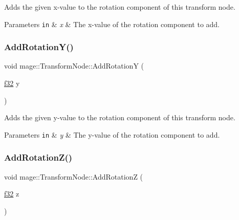 Adds the given x-\/value to the rotation component of this transform node.


\begin{DoxyParams}[1]{Parameters}
\mbox{\tt in}  & {\em x} & The x-\/value of the rotation component to add. \\
\hline
\end{DoxyParams}
\hypertarget{structmage_1_1_transform_node_aaec0123b3c40af36c346663045849447}{}\label{structmage_1_1_transform_node_aaec0123b3c40af36c346663045849447} 
\subsubsection{\texorpdfstring{Add\+Rotation\+Y()}{AddRotationY()}}
{\footnotesize\ttfamily void mage\+::\+Transform\+Node\+::\+Add\+RotationY (\begin{DoxyParamCaption}\item[{\hyperlink{namespacemage_a6a44ad388483959dc4dff9f2aef91431}{f32}}]{y }\end{DoxyParamCaption})\hspace{0.3cm}{\ttfamily [noexcept]}}

Adds the given y-\/value to the rotation component of this transform node.


\begin{DoxyParams}[1]{Parameters}
\mbox{\tt in}  & {\em y} & The y-\/value of the rotation component to add. \\
\hline
\end{DoxyParams}
\hypertarget{structmage_1_1_transform_node_ac1488ba0b460fa73ea387e9e08a9321b}{}\label{structmage_1_1_transform_node_ac1488ba0b460fa73ea387e9e08a9321b} 
\subsubsection{\texorpdfstring{Add\+Rotation\+Z()}{AddRotationZ()}}
{\footnotesize\ttfamily void mage\+::\+Transform\+Node\+::\+Add\+RotationZ (\begin{DoxyParamCaption}\item[{\hyperlink{namespacemage_a6a44ad388483959dc4dff9f2aef91431}{f32}}]{z }\end{DoxyParamCaption})\hspace{0.3cm}{\ttfamily [noexcept]}}

